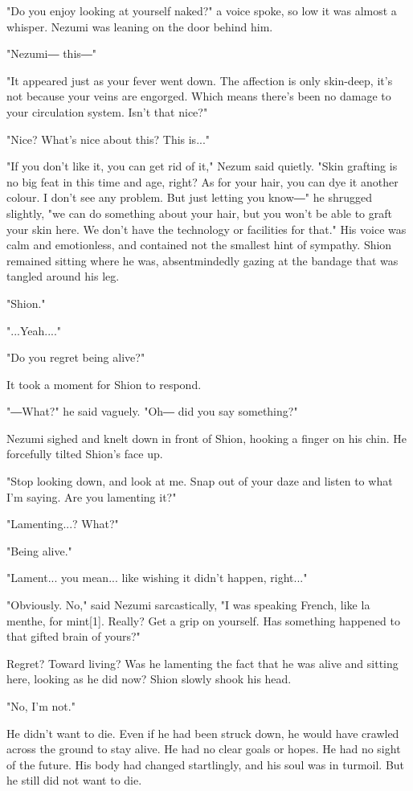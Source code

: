 "Do you enjoy looking at yourself naked?" a voice spoke, so low it was
almost a whisper. Nezumi was leaning on the door behind him.

"Nezumi― this―"

"It appeared just as your fever went down. The affection is only
skin-deep, it's not because your veins are engorged. Which means there's
been no damage to your circulation system. Isn't that nice?"

"Nice? What's nice about this? This is..."

"If you don't like it, you can get rid of it," Nezum said quietly. "Skin
grafting is no big feat in this time and age, right? As for your hair,
you can dye it another colour. I don't see any problem. But just letting
you know―" he shrugged slightly, "we can do something about your hair,
but you won't be able to graft your skin here. We don't have the
technology or facilities for that." His voice was calm and emotionless,
and contained not the smallest hint of sympathy. Shion remained sitting
where he was, absentmindedly gazing at the bandage that was tangled
around his leg.

"Shion."

"...Yeah...."

"Do you regret being alive?"

It took a moment for Shion to respond.

"―What?" he said vaguely. "Oh― did you say something?"

Nezumi sighed and knelt down in front of Shion, hooking a finger on his
chin. He forcefully tilted Shion's face up.

"Stop looking down, and look at me. Snap out of your daze and listen to
what I'm saying. Are you lamenting it?"

"Lamenting...? What?"

"Being alive."

"Lament... you mean... like wishing it didn't happen, right..."

"Obviously. No," said Nezumi sarcastically, "I was speaking French, like
la menthe, for mint{[}1{]}. Really? Get a grip on yourself. Has
something happened to that gifted brain of yours?"

Regret? Toward living? Was he lamenting the fact that he was alive and
sitting here, looking as he did now? Shion slowly shook his head.

"No, I'm not."

He didn't want to die. Even if he had been struck down, he would have
crawled across the ground to stay alive. He had no clear goals or hopes.
He had no sight of the future. His body had changed startlingly, and his
soul was in turmoil. But he still did not want to die.

